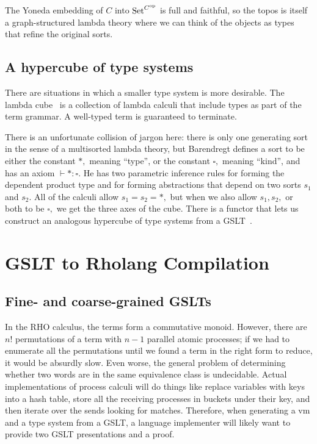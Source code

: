 \documentclass{article}
\begin{document}
The Yoneda embedding of $C$ into ${\rm Set}^{C^{\rm op}}$ is full and faithful, so the topos is itself a graph-structured lambda theory where we can think of the objects as types that refine the original sorts.

\subsection{A hypercube of type systems}

There are situations in which a smaller type system is more desirable. The lambda cube~\cite{Barendregt1991} is a collection of lambda calculi that include types as part of the term grammar.  A well-typed term is guaranteed to terminate.  

There is an unfortunate collision of jargon here: there is only one generating sort in the sense of a multisorted lambda theory, but Barendregt defines a sort to be either the constant $*,$ meaning ``type'', or the constant $\square,$ meaning ``kind'', and has an axiom $\vdash *\colon \square.$  He has two parametric inference rules for forming the dependent product type and for forming abstractions that depend on two sorts $s_1$ and $s_2.$  All of the calculi allow $s_1 = s_2 = *,$ but when we also allow $s_1, s_2,$ or both to be $\square,$ we get the three axes of the cube.  There is a functor that lets us construct an analogous hypercube of type systems from a GSLT~\cite{HypercubePaper}.

\section{GSLT to Rholang Compilation}

\subsection{Fine- and coarse-grained GSLTs}
In the RHO calculus, the terms form a commutative monoid.  However, there are $n!$ permutations of a term with $n-1$ parallel atomic processes; if we had to enumerate all the permutations until we found a term in the right form to reduce, it would be absurdly slow.  Even worse, the general problem of determining whether two words are in the same equivalence class is undecidable.  Actual implementations of process calculi will do things like replace variables with keys into a hash table, store all the receiving processes in buckets under their key, and then iterate over the sends looking for matches.  Therefore, when generating a vm and a type system from a GSLT, a language implementer will likely want to provide two GSLT presentations and a proof.
\end{document}
